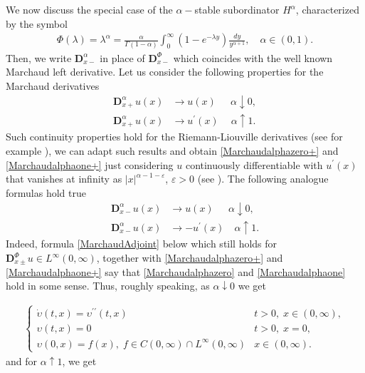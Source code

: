 \documentclass[11pt,a4paper]{article}
\theoremstyle{plain}
\theoremstyle{definition}
\theoremstyle{remark}
\begin{document}
\begin{itemize}
		We now discuss the special case of the $\alpha-$stable subordinator $H^\alpha$, characterized by the symbol
		\begin{align*}
			\Phi(\lambda)=\lambda^\alpha=\frac{\alpha}{\Gamma(1-\alpha)} \int_0^\infty (1-e^{-\lambda y}) \frac{dy}{y^{\alpha+1}}, \quad \alpha \in (0,1).
		\end{align*}
		Then, we write $\mathbf{D}_{x-}^\alpha$ in place of $\mathbf{D}_{x-}^{\Phi}$ which coincides with the well known Marchaud left derivative. Let us consider the following properties for the Marchaud derivatives
		\begin{align}
			\label{Marchaudalphazero+}
			\mathbf{D}_{x+}^\alpha u(x) &\to u(x) \quad \ \ \alpha \downarrow 0,\\
			\label{Marchaudalphaone+}
			\mathbf{D}_{x+}^\alpha u(x) &\to u^\prime(x) \quad \  \alpha \uparrow 1.
		\end{align}
		Such continuity properties hold for the Riemann-Liouville derivatives (see for example \cite[(2.2.5)]{kilbas2006theory}), we can adapt such results and obtain \eqref{Marchaudalphazero+} and \eqref{Marchaudalphaone+} just considering $u$ continuously differentiable with $u^\prime(x)$ that vanishes at infinity as $\vert x \vert^{\alpha-1-\varepsilon}$, $\varepsilon>0$ (see \cite[Section 5.4]{samko1993fractional}). The following analogue formulas hold true
		\begin{align}
			\label{Marchaudalphazero}
			\mathbf{D}_{x-}^\alpha u(x) &\to u(x) \quad \ \ \alpha \downarrow 0,\\
			\label{Marchaudalphaone}
			\mathbf{D}_{x-}^\alpha u(x) &\to -u^\prime(x) \quad \alpha \uparrow 1 .
		\end{align}
		Indeed, formula \eqref{MarchaudAdjoint} below which still holds for $\mathbf{D}_{x\pm}^\Phi u \in L^\infty(0,\infty)$, together with \eqref{Marchaudalphazero+} and \eqref{Marchaudalphaone+} say that \eqref{Marchaudalphazero} and \eqref{Marchaudalphaone} hold in some sense. Thus, roughly speaking,  as $\alpha \downarrow 0$ we get
		
		\begin{align}
			\label{killedBM}
			\begin{cases}
				\displaystyle 	\dot{\upsilon}(t,x)= \upsilon^{\prime \prime}(t,x) & t>0,\; x \in (0,\infty),\\
				\displaystyle  \upsilon(t,x)=0   & t>0,\; x=0,\\
				\displaystyle 	\upsilon(0,x)=f(x), \; f \in C(0,\infty) \cap L^\infty(0, \infty)  &x\in (0, \infty).
			\end{cases}
		\end{align}
		and for $\alpha \uparrow 1$, we get
		

\end{itemize}
\end{document}
